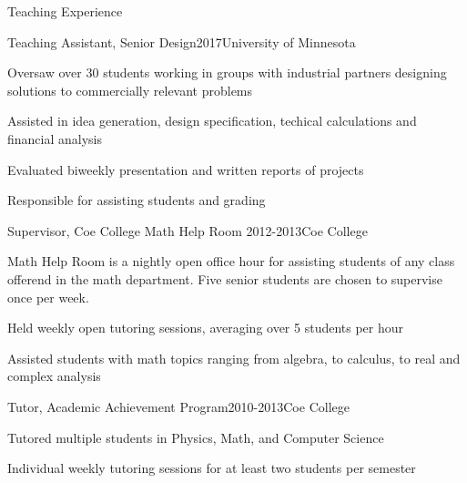 \documentclass{resume} %
\begin{document}
\begin{rSection}{Teaching Experience}
\begin{rSubsection}{Teaching Assistant, Senior Design}{2017}{University of Minnesota}{}
\item Oversaw over 30 students working in groups with industrial partners designing solutions to commercially relevant problems
\item Assisted in idea generation, design specification, techical calculations and financial analysis
\item Evaluated biweekly presentation and written reports of projects
\item Responsible for assisting students and grading
\end{rSubsection}
\begin{rSubsection}{Supervisor, Coe College Math Help Room }{2012-2013}{Coe College}{}
\item Math Help Room is a nightly open office hour for assisting students of any class offerend in the math department.  Five senior students are chosen to supervise once per week.
\item Held weekly open tutoring sessions, averaging over 5 students per hour
\item Assisted students with math topics ranging from algebra, to calculus, to real and complex analysis
\end{rSubsection}

\begin{rSubsection}{Tutor, Academic Achievement Program}{2010-2013}{Coe College}{}
\item Tutored multiple students in Physics, Math, and Computer Science
\item Individual weekly tutoring sessions for at least two students per semester
\end{rSubsection}

\end{rSection}
\end{document}
